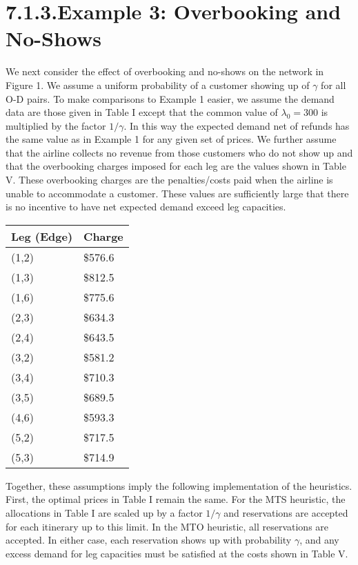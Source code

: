 \section{7.1.3.Example 3: Overbooking and No-Shows}\label{overbooking-and-no-shows}

We next consider the effect of overbooking and no-shows on the network in Figure 1. We assume a uniform probability of a customer showing up of \(\gamma\) for all O-D pairs. To make comparisons to Example 1 easier, we assume the demand data are those given in Table I except that the common value of \(\lambda_0 = 300\) is multiplied by the factor \(1 / \gamma\). In this way the expected demand net of refunds has the same value as in Example 1 for any given set of prices. We further assume that the airline collects no revenue from those customers who do not show up and that the overbooking charges imposed for each leg are the values shown in Table V. These overbooking charges are the penalties/costs paid when the airline is unable to accommodate a customer. These values are sufficiently large that there is no incentive to have net expected demand exceed leg capacities.

\begin{longtable}{|l|l|}
\hline
Leg (Edge) & Charge \\
\hline
(1,2) & \$576.6 \\
\hline
(1,3) & \$812.5 \\
\hline
(1,6) & \$775.6 \\
\hline
(2,3) & \$634.3 \\
\hline
(2,4) & \$643.5 \\
\hline
(3,2) & \$581.2 \\
\hline
(3,4) & \$710.3 \\
\hline
(3,5) & \$689.5 \\
\hline
(4,6) & \$593.3 \\
\hline
(5,2) & \$717.5 \\
\hline
(5,3) & \$714.9 \\
\hline
\end{longtable}

Together, these assumptions imply the following implementation of the heuristics. First, the optimal prices in Table I remain the same. For the MTS heuristic, the allocations in Table I are scaled up by a factor \(1 / \gamma\) and reservations are accepted for each itinerary up to this limit. In the MTO heuristic, all reservations are accepted. In either case, each reservation shows up with probability \(\gamma\), and any excess demand for leg capacities must be satisfied at the costs shown in Table V.

